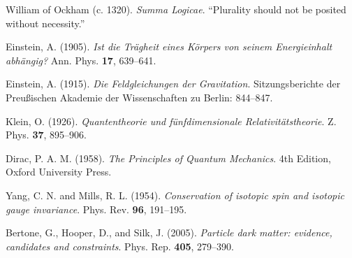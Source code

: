 \documentclass[12pt,a4paper]{article}
\theoremstyle{definition}
\theoremstyle{remark}
\begin{document}
\begin{thebibliography}{99}
		William of Ockham (c. 1320). \textit{Summa Logicae}. ``Plurality should not be posited without necessity.''
		
		Einstein, A. (1905). \textit{Ist die Tr\"agheit eines K\"orpers von seinem Energieinhalt abh\"angig?} Ann. Phys. \textbf{17}, 639--641.
		
		Einstein, A. (1915). \textit{Die Feldgleichungen der Gravitation}. Sitzungsberichte der Preußischen Akademie der Wissenschaften zu Berlin: 844--847.
		
		Klein, O. (1926). \textit{Quantentheorie und f\"unfdimensionale Relativit\"atstheorie}. Z. Phys. \textbf{37}, 895--906.
		
		Dirac, P. A. M. (1958). \textit{The Principles of Quantum Mechanics}. 4th Edition, Oxford University Press.
		
		Yang, C. N. and Mills, R. L. (1954). \textit{Conservation of isotopic spin and isotopic gauge invariance}. Phys. Rev. \textbf{96}, 191--195.
		
		Bertone, G., Hooper, D., and Silk, J. (2005). \textit{Particle dark matter: evidence, candidates and constraints}. Phys. Rep. \textbf{405}, 279--390.
	\end{thebibliography}
	
\end{document}
